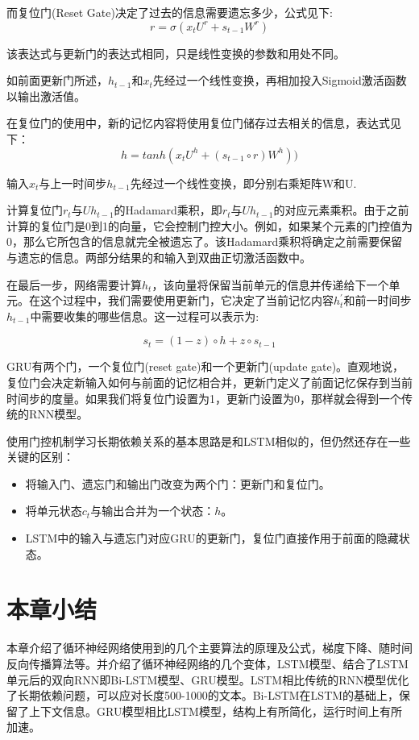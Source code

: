 \documentclass[a4paper,AutoFakeBold,oneside,12pt]{book}
\begin{document}
而复位门(Reset Gate)决定了过去的信息需要遗忘多少，公式见下:
$$ r = \sigma(x_t{U^r}+s_{t-1}W^r) $$

该表达式与更新门的表达式相同，只是线性变换的参数和用处不同。

如前面更新门所述，$h_{t-1}$和$x_t$先经过一个线性变换，再相加投入Sigmoid激活函数以输出激活值。

在复位门的使用中，新的记忆内容将使用复位门储存过去相关的信息，表达式见下：
$$ h = tanh(x_t{U^h}+(s_{t-1} \circ r)W^h )) $$

输入$x_t$与上一时间步$h_{t-1}$先经过一个线性变换，即分别右乘矩阵W和U.

计算复位门$r_t$与$Uh_{t-1}$的Hadamard乘积，即$r_t$与$Uh_{t-1}$的对应元素乘积。由于之前计算的复位门是0到1的向量，它会控制门控大小。例如，如果某个元素的门控值为0，那么它所包含的信息就完全被遗忘了。该Hadamard乘积将确定之前需要保留与遗忘的信息。两部分结果的和输入到双曲正切激活函数中。

在最后一步，网络需要计算$h_t$，该向量将保留当前单元的信息并传递给下一个单元。在这个过程中，我们需要使用更新门，它决定了当前记忆内容$h_t^{\prime}$和前一时间步$h_{t-1}$中需要收集的哪些信息。这一过程可以表示为:

$$ s_t = (1-z) \circ h + z \circ s_{t-1} $$

GRU有两个门，一个复位门(reset gate)和一个更新门(update gate)。直观地说，复位门会决定新输入如何与前面的记忆相合并，更新门定义了前面记忆保存到当前时间步的度量。如果我们将复位门设置为1，更新门设置为0，那样就会得到一个传统的RNN模型。

使用门控机制学习长期依赖关系的基本思路是和LSTM相似的，但仍然还存在一些关键的区别：
\begin{itemize}
    \item 将输入门、遗忘门和输出门改变为两个门：更新门和复位门。
    \item 将单元状态$c_t$与输出合并为一个状态：$h$。
    \item LSTM中的输入与遗忘门对应GRU的更新门，复位门直接作用于前面的隐藏状态。
\end{itemize}




\section{本章小结}

本章介绍了循环神经网络使用到的几个主要算法的原理及公式，梯度下降、随时间反向传播算法等。并介绍了循环神经网络的几个变体，LSTM模型、结合了LSTM单元后的双向RNN即Bi-LSTM模型、GRU模型。LSTM相比传统的RNN模型优化了长期依赖问题，可以应对长度500-1000的文本。Bi-LSTM在LSTM的基础上，保留了上下文信息。GRU模型相比LSTM模型，结构上有所简化，运行时间上有所加速。
\end{document}
